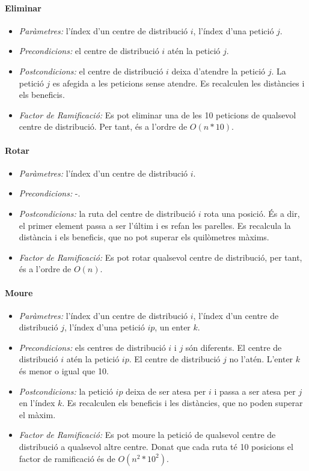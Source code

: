 \documentclass[a4paper]{article}
\begin{document}
\paragraph{Eliminar}
\begin{itemize}
\item \emph{Paràmetres:} l'índex d'un centre de distribució $i$, l'índex d'una petició $j$.
\item \emph{Precondicions:} el centre de distribució $i$ atén la petició $j$.
\item \emph{Postcondicions:} el centre de distribució $i$ deixa d'atendre la petició $j$. La petició $j$ es afegida a les peticions sense atendre. Es recalculen les distàncies i els beneficis.
\item \emph{Factor de Ramificació:} Es pot eliminar una de les 10 peticions de qualsevol centre de distribució. Per tant, és a l'ordre de $O(n*10)$.
\end{itemize}

\paragraph{Rotar}
\begin{itemize}
\item \emph{Paràmetres:} l'índex d'un centre de distribució $i$.
\item \emph{Precondicions:} -.
\item \emph{Postcondicions:} la ruta del centre de distribució $i$ rota una posició. És a dir, el primer element passa a ser l'últim i es refan les parelles. Es recalcula la distància i els beneficis, que no pot superar els quilòmetres màxims.
\item \emph{Factor de Ramificació:} Es pot rotar qualsevol centre de distribució, per tant, és a l'ordre de $O(n)$.
\end{itemize}

\paragraph{Moure}
\begin{itemize}
\item \emph{Paràmetres:} l'índex d'un centre de distribució $i$, l'índex d'un centre de distribució $j$, l'índex d'una petició $ip$, un enter $k$.
\item \emph{Precondicions:} els centres de distribució $i$ i $j$ són diferents. El centre de distribució $i$ atén la petició $ip$. El centre de distribució $j$ no l'atén. L'enter $k$ és menor o igual que 10.
\item \emph{Postcondicions:} la petició $ip$ deixa de ser atesa per $i$ i passa a ser atesa per $j$ en l'índex $k$. Es recalculen els beneficis i les distàncies, que no poden superar el màxim.
\item \emph{Factor de Ramificació:} Es pot moure la petició de qualsevol centre de distribució a qualsevol altre centre. Donat que cada ruta té 10 posicions el factor de ramificació és de $O(n^2*10^2)$.
\end{itemize}
\end{document}
